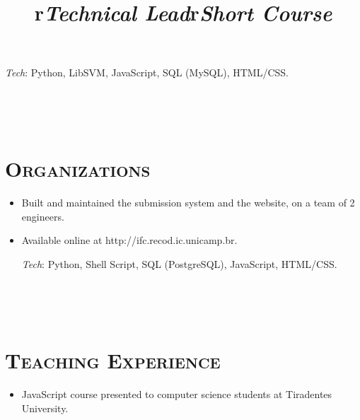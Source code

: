 \begin{resume}
\begin{position}
\begin{itemize}
\vspace{1mm}
{\small \emph{Tech}: Python, LibSVM, JavaScript, SQL (MySQL), HTML/CSS\@.}
\end{itemize}
\end{position}


\begin{formatb}
  \\
  \title{r}\\
\end{formatb}

\section{\textsc{Organizations}}

\title{\emph{Technical Lead}}
\begin{position}
\vspace{1mm}
\begin{itemize}\small
\item Built and maintained the submission system and the website, on a team of
  2 engineers.
\item Available online at http://ifc.recod.ic.unicamp.br.

\vspace{1mm}
{\small \emph{Tech}: Python, Shell Script, SQL (PostgreSQL), JavaScript,
HTML/CSS\@.}
\end{itemize}
\end{position}


\begin{formatb}
  \\
  \title{r}\\
\end{formatb}

\section{\textsc{Teaching Experience}}

\title{\emph{Short Course}}
\begin{position}
\vspace{1mm}
\begin{itemize}\small
\item JavaScript course presented to computer science students at Tiradentes
  University.
\end{itemize}
\end{position}


\end{resume}
